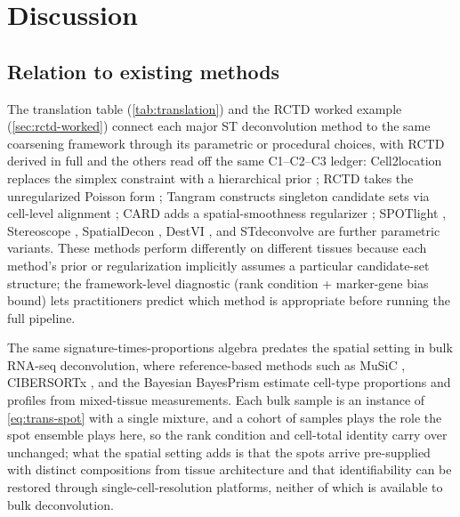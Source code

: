 \section{Discussion}
\label{sec:discussion}

\subsection{Relation to existing methods}

The translation table (\cref{tab:translation}) and the RCTD worked
example (\cref{sec:rctd-worked}) connect each major ST deconvolution
method to the same coarsening framework through its parametric or
procedural choices, with RCTD derived in full and the others read off
the same C1--C2--C3 ledger: Cell2location replaces the simplex constraint
with a hierarchical prior \citep{kleshchevnikov2022cell2location};
RCTD takes the unregularized Poisson form \citep{cable2021robust};
Tangram constructs singleton candidate sets via cell-level
alignment \citep{biancalani2021deep}; CARD adds a
spatial-smoothness regularizer \citep{ma2022spatially}; SPOTlight
\citep{elosua2021spotlight}, Stereoscope
\citep{andersson2020stereoscope}, SpatialDecon
\citep{danaher2022advances}, DestVI \citep{lopez2022destvi}, and
STdeconvolve \citep{miller2022reference} are further parametric
variants. These methods perform differently on different tissues
\citep{li2023comprehensive} because each method's prior or
regularization implicitly assumes a particular candidate-set
structure; the framework-level diagnostic (rank condition +
marker-gene bias bound) lets practitioners predict which method is
appropriate before running the full pipeline.

The same signature-times-proportions algebra predates the spatial
setting in bulk RNA-seq deconvolution, where reference-based methods such
as MuSiC \citep{wang2019music}, CIBERSORTx \citep{newman2019digital}, and
the Bayesian BayesPrism \citep{chu2022bayesprism} estimate cell-type
proportions and profiles from mixed-tissue measurements. Each bulk
sample is an instance of \cref{eq:trans-spot} with a single mixture, and
a cohort of samples plays the role the spot ensemble plays here, so the
rank condition and cell-total identity carry over unchanged; what the
spatial setting adds is that the spots arrive pre-supplied with distinct
compositions from tissue architecture and that identifiability can be
restored through single-cell-resolution platforms, neither of which is
available to bulk deconvolution.

